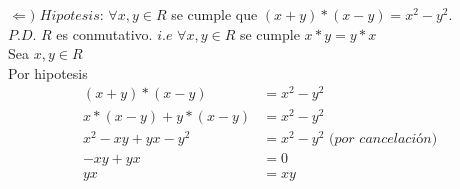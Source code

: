 \documentclass[12pt]{article}
\begin{document}
$\Longleftarrow)$ $Hipotesis$:  $\forall x, y \in R$ se cumple que $(x + y) \ast (x - y) = x^2 - y^2$.\\

$P.D$. $R$ es conmutativo. $i.e$ $\forall x, y \in R$ se cumple $x \ast y = y \ast x$\\

Sea $x, y \in R$\\

Por hipotesis
\begin{align*}
                (x + y) \ast (x - y) &= x^2 - y^2\\
                x \ast (x -y) + y \ast (x -y) &= x^2 - y^2\\
                x^2 -xy + yx -y^2 &= x^2 - y^2 \textit{ (por cancelación)}\\
                -xy + yx &= 0\\
                yx &= xy\\
              \end{align*}
\vspace{1cm}
\end{document}
